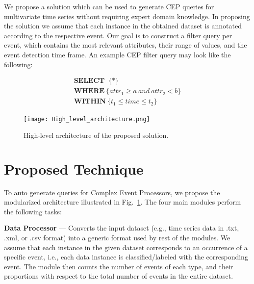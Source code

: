 \documentclass[conference]{IEEEtran}  %
\begin{document}
We propose a solution which can be used to generate CEP queries for multivariate time series without requiring expert domain knowledge. In proposing the solution we assume that each instance in the obtained dataset is annotated according to the respective event. Our goal is to construct a filter query per event, which contains the most relevant attributes, their range of values, and the event detection time frame. An example CEP filter query may look like the following:

\begin{equation}
\begin{split}
\textbf{SELECT }\ \{*\} \\ \textbf{WHERE}\ \{attr_1\geq a\ and \ attr_2<b\} \\ \textbf{WITHIN}\ \{t_1\leq time\leq t_2\}
\label{eq:query}
\end{split}
\end{equation}

\begin{figure}
\texttt{[image: High\_level\_architecture.png]}
\caption{High-level architecture of the proposed solution.}
\label{fig:archi}
\end{figure}

\section{Proposed Technique}
To auto generate queries for Complex Event Processors, we propose the modularized architecture illustrated in Fig.~\ref{fig:archi}. The four main modules perform the following tasks:

\textbf{Data Processor} --- Converts the input dataset (e.g., time series data in .txt, .xml, or .csv format) into a generic format used by rest of the modules. We assume that each instance in the given dataset corresponds to an occurrence of a specific event, i.e., each data instance is classified/labeled with the corresponding event. The module then counts the number of events of each type, and their proportions with respect to the total number of events in the entire dataset.
\end{document}
